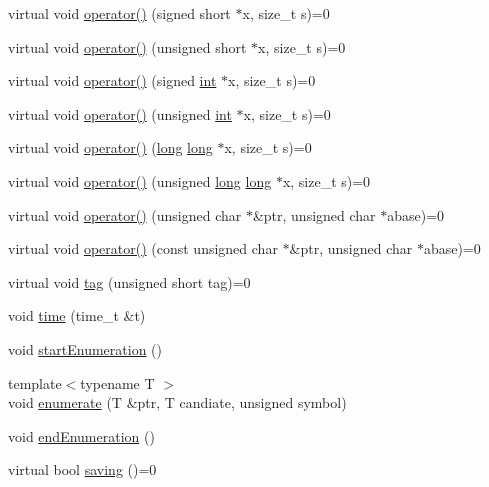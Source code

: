 \begin{DoxyCompactItemize}
\item 
virtual void \hyperlink{classgambatte_1_1loadsave_ac30751838bea28e3e266da5194b429d1}{operator()} (signed short $\ast$x, size\+\_\+t s)=0
\item 
virtual void \hyperlink{classgambatte_1_1loadsave_aa260c68090c6bb3b5620ac77ce70815d}{operator()} (unsigned short $\ast$x, size\+\_\+t s)=0
\item 
virtual void \hyperlink{classgambatte_1_1loadsave_a9f843edffc4473365246e8620d65f1e3}{operator()} (signed \hyperlink{ioapi_8h_a787fa3cf048117ba7123753c1e74fcd6}{int} $\ast$x, size\+\_\+t s)=0
\item 
virtual void \hyperlink{classgambatte_1_1loadsave_a0985be7f430a1626e2b0f47066e9a8b6}{operator()} (unsigned \hyperlink{ioapi_8h_a787fa3cf048117ba7123753c1e74fcd6}{int} $\ast$x, size\+\_\+t s)=0
\item 
virtual void \hyperlink{classgambatte_1_1loadsave_a34283e091c2bfae20f12f79fff2b8b36}{operator()} (\hyperlink{ioapi_8h_a3c7b35ad9dab18b8310343c201f7b27e}{long} \hyperlink{ioapi_8h_a3c7b35ad9dab18b8310343c201f7b27e}{long} $\ast$x, size\+\_\+t s)=0
\item 
virtual void \hyperlink{classgambatte_1_1loadsave_a93ef67515dbf61461e7370c9cc77c8a6}{operator()} (unsigned \hyperlink{ioapi_8h_a3c7b35ad9dab18b8310343c201f7b27e}{long} \hyperlink{ioapi_8h_a3c7b35ad9dab18b8310343c201f7b27e}{long} $\ast$x, size\+\_\+t s)=0
\item 
virtual void \hyperlink{classgambatte_1_1loadsave_a911a5ce78fbb8c4ceb36984a9967ea72}{operator()} (unsigned char $\ast$\&ptr, unsigned char $\ast$abase)=0
\item 
virtual void \hyperlink{classgambatte_1_1loadsave_a57518c27d7844ae48faea91fc04a680a}{operator()} (const unsigned char $\ast$\&ptr, unsigned char $\ast$abase)=0
\item 
virtual void \hyperlink{classgambatte_1_1loadsave_af4a635fc49c23e53e48b2b9d320aa165}{tag} (unsigned short tag)=0
\item 
void \hyperlink{classgambatte_1_1loadsave_a408680c3fae9e459f3dc4d2e9c6eef04}{time} (time\+\_\+t \&t)
\item 
void \hyperlink{classgambatte_1_1loadsave_acbec8a5cd9098a7a796a863149ed8e22}{start\+Enumeration} ()
\item 
{\footnotesize template$<$typename T $>$ }\\void \hyperlink{classgambatte_1_1loadsave_afead9849579608ea420342ae0ec0feee}{enumerate} (T \&ptr, T candiate, unsigned symbol)
\item 
void \hyperlink{classgambatte_1_1loadsave_a2fd5b7f803fc455d40921d815e07a50d}{end\+Enumeration} ()
\item 
virtual bool \hyperlink{classgambatte_1_1loadsave_a0a05b67eadfbb26f654f3d5ec287c652}{saving} ()=0
\end{DoxyCompactItemize}
